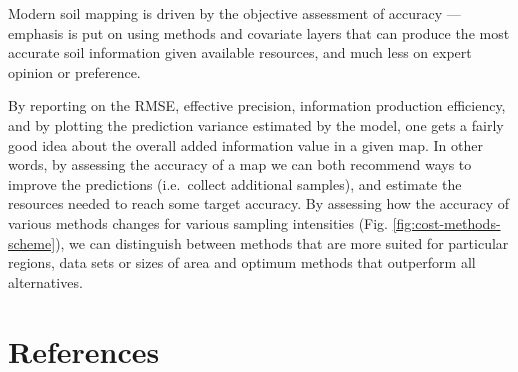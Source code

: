\documentclass[11pt]{krantz}
\makeatletter
\newenvironment{kframe}{%
\medskip{}
\setlength{\fboxsep}{.8em}
 \def\at@end@of@kframe{}%
 \ifinner\ifhmode%
  \def\at@end@of@kframe{\end{minipage}}%
  \begin{minipage}{\columnwidth}%
 \fi\fi%
 \def\FrameCommand##1{\hskip\@totalleftmargin \hskip-\fboxsep
 \colorbox{shadecolor}{##1}\hskip-\fboxsep
     \hskip-\linewidth \hskip-\@totalleftmargin \hskip\columnwidth}%
 \MakeFramed {\advance\hsize-\width
   \@totalleftmargin\z@ \linewidth\hsize
   \@setminipage}}%
 {\par\unskip\endMakeFramed%
 \at@end@of@kframe}
\newenvironment{rmdblock}[1]
  {
  \begin{itemize}
  \renewcommand{\labelitemi}{
    \raisebox{-.7\height}[0pt][0pt]{
      {\setkeys{Gin}{width=3em,keepaspectratio}\texttt{[image: images/\#1]}}
    }
  }
  \setlength{\fboxsep}{1em}
  \begin{kframe}
  \item
  }
  {
  \end{kframe}
  \end{itemize}
  }
\newenvironment{rmdnote}
  {\begin{rmdblock}{note}}
  {\end{rmdblock}}
\theoremstyle{definition}
\theoremstyle{definition}
\theoremstyle{definition}
\theoremstyle{remark}
\makeatother
\begin{document}
\begin{rmdnote}
Modern soil mapping is driven by the objective assessment of accuracy
--- emphasis is put on using methods and covariate layers that can
produce the most accurate soil information given available resources,
and much less on expert opinion or preference.
\end{rmdnote}

By reporting on the RMSE, effective precision, information production
efficiency, and by plotting the prediction variance estimated by the
model, one gets a fairly good idea about the overall added information
value in a given map. In other words, by assessing the accuracy of a map
we can both recommend ways to improve the predictions (i.e.~collect
additional samples), and estimate the resources needed to reach some
target accuracy. By assessing how the accuracy of various methods
changes for various sampling intensities (Fig.
\ref{fig:cost-methods-scheme}), we can distinguish between methods that
are more suited for particular regions, data sets or sizes of area and
optimum methods that outperform all alternatives.

\hypertarget{references}{%
\chapter*{References}\label{references}}




\backmatter
\printindex
\end{document}
